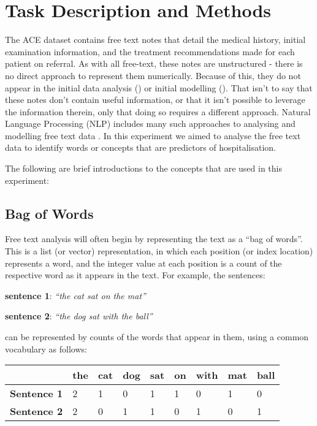    \section{Task Description and Methods}\label{sec:task-description-and-methods}

   The ACE dataset contains free text notes that detail the medical history, initial examination information, and the treatment recommendations made for each patient on referral. As with all free-text, these notes are unstructured - there is no direct approach to represent them numerically. Because of this, they do not appear in the initial data analysis () or initial modelling (). That isn't to say that these notes don't contain useful information, or that it isn't possible to leverage the information therein, only that doing so requires a different approach. Natural Language Processing (NLP) includes many such approaches to analysing and modelling free text data \cite{nltk}. In this  experiment we aimed to analyse the free text data to identify words or concepts that are predictors of hospitalisation.

   The following are brief introductions to the concepts that are used in this experiment:

   \subsection{Bag of Words}\label{subsec:bag-of-words}

   Free text analysis will often begin by representing the text as a ``bag of words''. This is a list (or vector) representation, in which each position (or index location) represents a word, and the integer value at each position is a count of the respective word as it appears in the text. For example, the sentences:

   \vspace{3mm}
   \textbf{sentence 1}: \textit{``the cat sat on the mat''}

   \textbf{sentence 2}: \textit{``the dog sat with the ball''}
   \vspace{3mm}

   can be represented by counts of the words that appear in them, using a common vocabulary as follows:

   \begin{table}[H]
       \centering
       \begin{tabular}{ P{23mm} P{8mm} P{8mm} P{8mm} P{8mm} P{8mm} P{8mm} P{8mm} P{8mm} }
           \toprule
           & \textbf{the} & \textbf{cat} & \textbf{dog}  & \textbf{sat} & \textbf{on} & \textbf{with} & \textbf{mat} & \textbf{ball} \\\toprule
           \textbf{Sentence 1} & 2 & 1 & 0 & 1 & 1 & 0 & 1 & 0 \\
           \textbf{Sentence 2} & 2 & 0 & 1 & 1 & 0 & 1 & 0 & 1 \\
           \toprule
       \end{tabular}\label{tab:table}
   \end{table}

